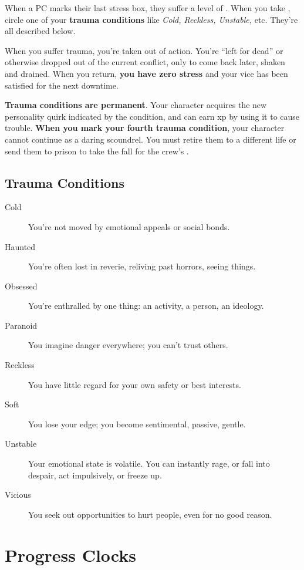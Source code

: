 When a PC marks their last stress box, they suffer a level of . When you take , circle one of your \textbf{trauma conditions} like \emph{Cold, Reckless, Unstable,} etc. They’re all described below.

When you suffer trauma, you’re taken out of action. You’re ``left for dead'' or otherwise dropped out of the current conflict, only to come back later, shaken and drained. When you return, \textbf{you have zero stress} and your vice has been satisfied for the next downtime.

\textbf{Trauma conditions are permanent}. Your character acquires the new personality quirk indicated by the condition, and can earn xp by using it to cause trouble. \textbf{When you mark your fourth trauma condition}, your character cannot continue as a daring scoundrel. You must retire them to a different life or send them to prison to take the fall for the crew’s .

\subsection{Trauma Conditions}

\begin{description}
\item[Cold] You’re not moved by emotional appeals or social bonds.
\item[Haunted] You’re often lost in reverie, reliving past horrors, seeing things.
\item[Obsessed] You’re enthralled by one thing: an activity, a person, an ideology.
\item[Paranoid] You imagine danger everywhere; you can’t trust others.
\item[Reckless] You have little regard for your own safety or best interests.
\item[Soft] You lose your edge; you become sentimental, passive, gentle.
\item[Unstable] Your emotional state is volatile. You can instantly rage, or fall into despair, act impulsively, or freeze up.
\item[Vicious] You seek out opportunities to hurt people, even for no good reason.
\end{description}

\section{Progress Clocks}

